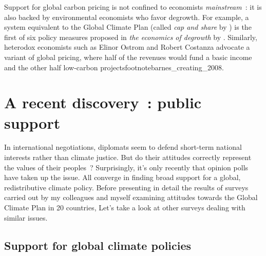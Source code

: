 \documentclass[a5paper,french,openany]{memoir}
\begin{document}
Support for global carbon pricing is not confined to economists \textit{mainstream}~: it is also backed by environmental economists who favor degrowth. For example, a system equivalent to the Global Climate Plan (called \textit{cap and share} by \citealp{douthwaite_degrowth_2012}) is the first of six policy measures proposed in \textit{the economics of degrowth} by \cite{kallis_economics_2012}. Similarly, heterodox economists such as Elinor Ostrom and Robert Costanza advocate a variant of global pricing, where half of the revenues would fund a basic income and the other half low-carbon projectsfootnote{barnes_creating_2008}.%

\section{A recent discovery~: public support} \label{sec:support}

In international negotiations, diplomats seem to defend short-term national interests rather than climate justice. 
But do their attitudes correctly represent the values of their peoples~? 
Surprisingly, it's only recently that opinion polls have taken up the issue. All converge in finding broad support for a global, redistributive climate policy. Before presenting in detail the results of surveys carried out by my colleagues and myself examining attitudes towards the Global Climate Plan in 20 countries, %
Let's take a look at other surveys dealing with similar issues. 

\subsection{Support for global climate policies}
\end{document}
